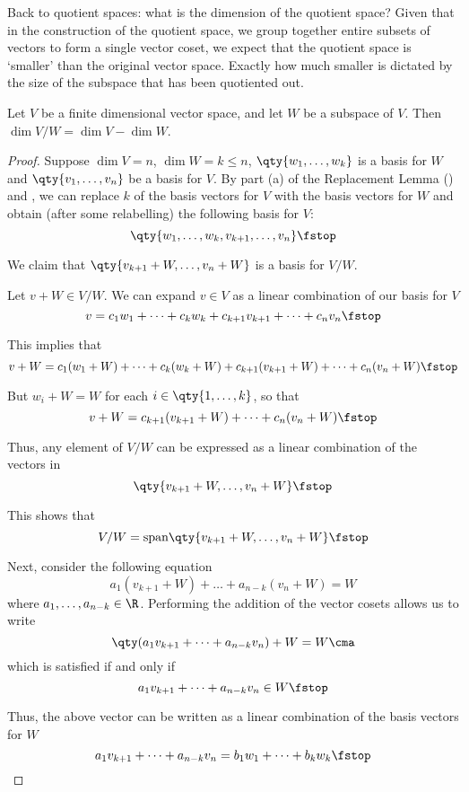  Back to quotient spaces: what is the dimension of the quotient space? Given that in the construction of the quotient space, we group together entire subsets of vectors to form a single vector coset, we expect that the quotient space is `smaller' than the original vector space. Exactly how much smaller is dictated by the size of the subspace that has been quotiented out.
 \begin{proposition}
   \label{thm:codim}
   Let \( V \) be a finite dimensional vector space, and let \( W \) be a subspace of \( V \). Then \( \dim V/W=\dim V-\dim W \).
 \end{proposition}
 \begin{proof}
   Suppose \( \dim V=n \), \( \dim W=k\leq n \), \( \qty{w_1,\dots, w_k} \) is a basis for \( W \) and \( \qty{v_1,\dots, v_n} \) be a basis for \( V \). By part (a) of the Replacement Lemma () and , we can replace \( k \) of the basis vectors for \( V \) with the basis vectors for \( W \) and obtain (after some relabelling) the following basis for \( V \):
   \[ \qty{w_1,\dots,w_k,v_{k+1},\dots,v_n}\fstop \]

   We claim that \( \qty{v_{k+1}+W,\dots,v_n+W} \) is a basis for \( V/W \).

   \vspace{3mm}

   Let \( v+W\in V/W \). We can expand \( v\in V \) as a linear combination of our basis for \( V \)
   \[ v=c_1w_1+\dots+c_kw_k+c_{k+1}v_{k+1}+\dots+c_nv_n\fstop \]

   This implies that
   \[ v+W=c_1(w_1+W)+\dots+c_k(w_k+W)+c_{k+1}(v_{k+1}+W)+\dots+c_n(v_n+W)\fstop \]

   But \( w_i+W=W \) for each \( i\in\qty{1,\dots,k} \), so that
   \[ v+W=c_{k+1}(v_{k+1}+W)+\dots+c_n(v_n+W)\fstop \]

   Thus, any element of \( V/W \) can be expressed as a linear combination of the vectors in
   \[ \qty{v_{k+1}+W,\dots,v_n+W} \fstop \]

   This shows that
   \[ V/W=\text{span}\qty{v_{k+1}+W,\dots,v_n+W}\fstop \]

   Next, consider the following equation
   \[ a_1(v_{k+1}+W)+\dots+a_{n-k}(v_n+W)=W \]
   where \( a_1,\dots,a_{n-k}\in \R \). Performing the addition of the vector cosets allows us to write
   \[ \qty(a_1v_{k+1}+\dots+a_{n-k}v_n)+W=W\cma \]
   which is satisfied if and only if
   \[ a_1v_{k+1}+\dots+a_{n-k}v_n\in W\fstop \]

   Thus, the above vector can be written as a linear combination of the basis vectors for \( W \)
   \[ a_1v_{k+1}+\dots+a_{n-k}v_n=b_1w_1+\dots+b_kw_k\fstop \]


\end{proof}
